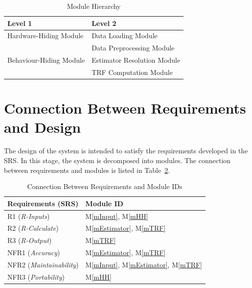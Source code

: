 \documentclass[12pt, titlepage]{article}
\newcommand{\mref}[1]{M\ref{#1}}
\begin{document}
\begin{table}[h!]
\centering
\begin{tabular}{p{} p{}}
\toprule
\textbf{Level 1} & \textbf{Level 2}\\
\midrule

{Hardware-Hiding Module} & Data Loading Module \\
\midrule

\multirow{3}{0.3\textwidth}{Behaviour-Hiding Module} & Data Preprocessing Module\\
& Estimator Resolution Module\\
& TRF Computation Module\\
\bottomrule

\end{tabular}
\caption{Module Hierarchy}
\label{TblMH}
\end{table}

\section{Connection Between Requirements and Design} \label{SecConnection}

The design of the system is intended to satisfy the requirements developed in
the SRS. In this stage, the system is decomposed into modules. The connection
between requirements and modules is listed in Table~\ref{TblConnection}.

\begin{table}[H]
\centering
\begin{tabular}{p{} p{}}
\toprule
\textbf{Requirements (SRS)} & \textbf{Module ID}\\
\midrule
R1 (\textit{R-Inputs}) & \mref{mInput}, \mref{mHH}\\
R2 (\textit{R-Calculate}) & \mref{mEstimator}, \mref{mTRF}\\
R3 (\textit{R-Output}) & \mref{mTRF}\\
NFR1 (\textit{Accuracy}) & \mref{mEstimator}, \mref{mTRF}\\
NFR2 (\textit{Maintainability}) & \mref{mInput}, \mref{mEstimator}, \mref{mTRF}\\
NFR3 (\textit{Portability}) & \mref{mHH}\\
\bottomrule
\end{tabular}
\caption{Connection Between Requirements and Module IDs}
\label{TblConnection}
\end{table}

\end{document}
